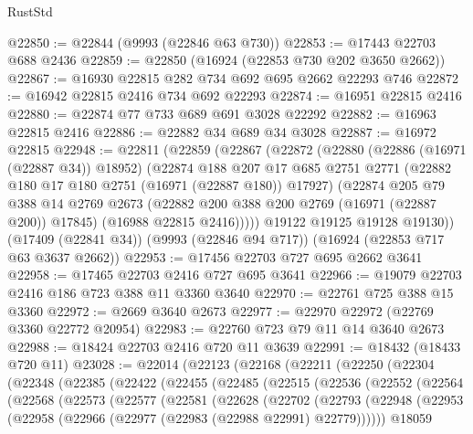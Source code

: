 \begin{lexlean}{RustStd}
\begin{coremodule}
@22850 := @22844 (@9993 (@22846 @63 @730))
@22853 := @17443 @22703 @688 @2436
@22859 := @22850 (@16924 (@22853 @730 @202 @3650 @2662))
@22867 := @16930 @22815 @282 @734 @692 @695 @2662 @22293 @746
@22872 := @16942 @22815 @2416 @734 @692 @22293
@22874 := @16951 @22815 @2416
@22880 := @22874 @77 @733 @689 @691 @3028 @22292
@22882 := @16963 @22815 @2416
@22886 := @22882 @34 @689 @34 @3028
@22887 := @16972 @22815
@22948 := @22811
    (@22859
      (@22867
        (@22872
          (@22880
            (@22886 (@16971 (@22887 @34)) @18952)
            (@22874
              @188
              @207
              @17
              @685
              @2751
              @2771
              (@22882 @180 @17 @180 @2751 (@16971 (@22887 @180)) @17927)
              (@22874
                @205
                @79
                @388
                @14
                @2769
                @2673
                (@22882 @200 @388 @200 @2769 (@16971 (@22887 @200)) @17845)
                (@16988 @22815 @2416)))))
        @19122
        @19125
        @19128
        @19130))
    (@17409 (@22841 @34))
    (@9993 (@22846 @94 @717))
    (@16924 (@22853 @717 @63 @3637 @2662))
@22953 := @17456 @22703 @727 @695 @2662 @3641
@22958 := @17465 @22703 @2416 @727 @695 @3641
@22966 := @19079 @22703 @2416 @186 @723 @388 @11 @3360 @3640
@22970 := @22761 @725 @388 @15 @3360
@22972 := @2669 @3640 @2673
@22977 := @22970 @22972 (@22769 @3360 @22772 @20954)
@22983 := @22760 @723 @79 @11 @14 @3640 @2673
@22988 := @18424 @22703 @2416 @720 @11 @3639
@22991 := @18432 (@18433 @720 @11)
@23028 := @22014
    (@22123
      (@22168
        (@22211
          (@22250
            (@22304
              (@22348
                (@22385
                  (@22422
                    (@22455
                      (@22485
                        (@22515
                          (@22536
                            (@22552
                              (@22564
                                (@22568
                                  (@22573
                                    (@22577
                                      (@22581
                                        (@22628
                                          (@22702
                                            (@22793
                                              (@22948
                                                (@22953
                                                  (@22958
                                                    (@22966
                                                      (@22977 (@22983 (@22988 @22991) @22779))))))
                                              @18059

\end{coremodule}
\end{lexlean}
